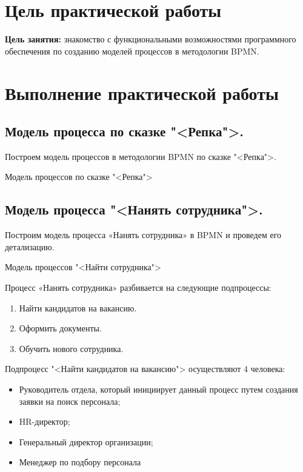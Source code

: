 \graphicspath{{./tenth/img/}}

\section{Цель практической работы}
\textbf{Цель занятия:}
знакомство с функциональными возможностями программного
обеспечения по созданию моделей процессов в методологии BPMN.

\clearpage

\section{Выполнение практической работы}
\subsection{Модель процесса по сказке "<Репка">.}
Построем модель процессов в методологии BPMN по сказке "<Репка">.

\begin{image}
	\caption{Модель процессов по сказке "<Репка">}
\end{image}

\subsection{Модель процесса "<Нанять сотрудника">.}
Построим модель процесса «Нанять сотрудника» в BPMN и проведем его
детализацию.

\begin{image}
	\caption{Модель процессов "<Найти сотрудника">}
\end{image}

Процесс «Нанять сотрудника» разбивается на следующие подпроцессы:

\begin{enumerate}
	\item Найти кандидатов на вакансию.
	\item Оформить документы.
	\item Обучить нового сотрудника.
\end{enumerate}

Подпроцесс "<Найти кандидатов на вакансию"> осуществляют 4 человека:

\begin{itemize}
	\item Руководитель отдела, который инициирует данный процесс
		путем создания заявки на поиск персонала;
	\item HR-директор;
	\item Генеральный директор организации;
	\item Менеджер по подбору персонала
\end{itemize}

